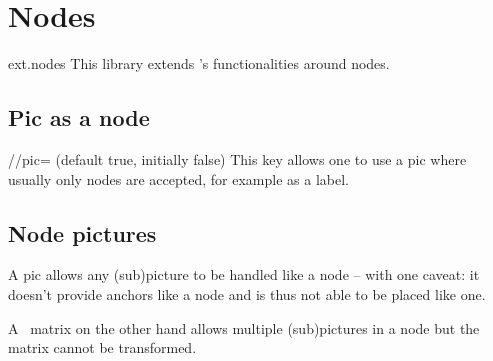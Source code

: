 %
%
%

\section{Nodes}
\begin{tikzlibrary}{ext.nodes}
This library extends \tikzname's functionalities around nodes.
\end{tikzlibrary}

\begin{multicols}{2}
\subsection{Pic as a node}
\begin{key}{/\tikzext/pic= (default true, initially false)}
This key allows one to use a pic where usually only nodes are accepted,
for example as a label.
\begin{codeexample}[preamble=\usetikzlibrary{ext.nodes}]
\begin{tikzpicture}[
  slsl/.pic={\draw(-2pt, 1.5pt)--( 2pt, .5pt)
                  ( 2pt,-1.5pt)--(-2pt,-.5pt);}]
\node[
  draw, minimum width=3cm, minimum height=1cm,
  label={[ext/pic            ] east:slsl},
  label={[ext/pic, rotate= 90]north:slsl},
  label={[ext/pic            ] west:slsl},
  label={[ext/pic, rotate=-90]south:slsl}]{};
\end{tikzpicture}
\end{codeexample}
\end{key}
\newcolumn

\subsection{Node pictures}
A pic allows any (sub)picture to be handled like a node --
with one caveat: it doesn't provide anchors like a node and
is thus not able to be placed like one.

A \pgfname\ matrix on the other hand allows multiple (sub)pictures in a node
but the matrix cannot be transformed.


\end{multicols}
